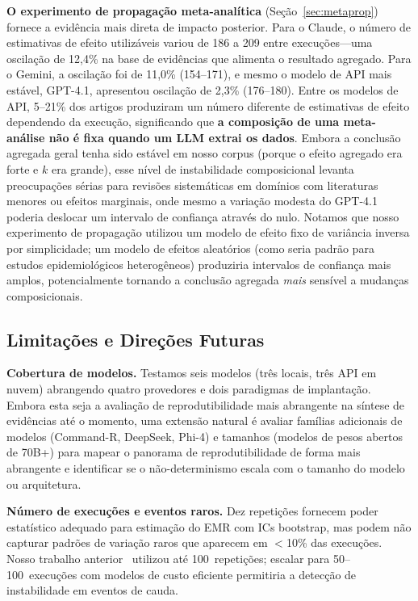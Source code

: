 \documentclass[12pt, a4paper]{article}
\begin{document}
\textbf{O experimento de propagação meta-analítica} (Seção~\ref{sec:metaprop}) fornece a evidência mais direta de impacto posterior.
Para o Claude, o número de estimativas de efeito utilizáveis variou de 186 a 209 entre execuções---uma oscilação de 12,4\% na base de evidências que alimenta o resultado agregado.
Para o Gemini, a oscilação foi de 11,0\% (154--171), e mesmo o modelo de API mais estável, GPT-4.1, apresentou oscilação de 2,3\% (176--180).
Entre os modelos de API, 5--21\% dos artigos produziram um número diferente de estimativas de efeito dependendo da execução, significando que \textbf{a composição de uma meta-análise não é fixa quando um LLM extrai os dados}.
Embora a conclusão agregada geral tenha sido estável em nosso corpus (porque o efeito agregado era forte e $k$ era grande), esse nível de instabilidade composicional levanta preocupações sérias para revisões sistemáticas em domínios com literaturas menores ou efeitos marginais, onde mesmo a variação modesta do GPT-4.1 poderia deslocar um intervalo de confiança através do nulo.
Notamos que nosso experimento de propagação utilizou um modelo de efeito fixo de variância inversa por simplicidade; um modelo de efeitos aleatórios (como seria padrão para estudos epidemiológicos heterogêneos) produziria intervalos de confiança mais amplos, potencialmente tornando a conclusão agregada \emph{mais} sensível a mudanças composicionais.

\subsection{Limitações e Direções Futuras}
\label{sec:limitations}

\textbf{Cobertura de modelos.}
Testamos seis modelos (três locais, três API em nuvem) abrangendo quatro provedores e dois paradigmas de implantação.
Embora esta seja a avaliação de reprodutibilidade mais abrangente na síntese de evidências até o momento, uma extensão natural é avaliar famílias adicionais de modelos (Command-R, DeepSeek, Phi-4) e tamanhos (modelos de pesos abertos de 70B+) para mapear o panorama de reprodutibilidade de forma mais abrangente e identificar se o não-determinismo escala com o tamanho do modelo ou arquitetura.

\textbf{Número de execuções e eventos raros.}
Dez repetições fornecem poder estatístico adequado para estimação do EMR com ICs bootstrap, mas podem não capturar padrões de variação raros que aparecem em $<$10\% das execuções.
Nosso trabalho anterior~\citep{rover2026jair} utilizou até 100~repetições; escalar para 50--100~execuções com modelos de custo eficiente permitiria a detecção de instabilidade em eventos de cauda.
\end{document}
